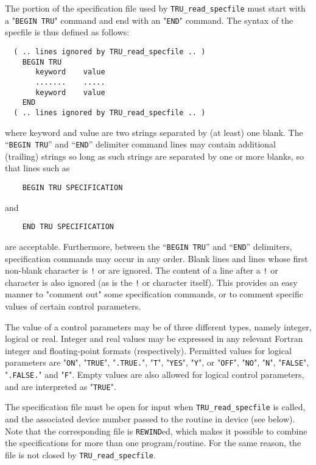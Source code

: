 \documentclass{galahad}
\newcommand{\packagename}{TRU}
\begin{document}
The portion of the specification file used by
{\tt \packagename\_read\_specfile}
must start
with a "{\tt BEGIN \packagename}" command and end with an
"{\tt END}" command.  The syntax of the specfile is thus defined as follows:
\begin{verbatim}
  ( .. lines ignored by TRU_read_specfile .. )
    BEGIN TRU
       keyword    value
       .......    .....
       keyword    value
    END
  ( .. lines ignored by TRU_read_specfile .. )
\end{verbatim}
where keyword and value are two strings separated by (at least) one blank.
The ``{\tt BEGIN \packagename}'' and ``{\tt END}'' delimiter command lines
may contain additional (trailing) strings so long as such strings are
separated by one or more blanks, so that lines such as
\begin{verbatim}
    BEGIN TRU SPECIFICATION
\end{verbatim}
and
\begin{verbatim}
    END TRU SPECIFICATION
\end{verbatim}
are acceptable. Furthermore,
between the
``{\tt BEGIN \packagename}'' and ``{\tt END}'' delimiters,
specification commands may occur in any order.  Blank lines and
lines whose first non-blank character is {\tt !} or {\tt *} are ignored.
The content
of a line after a {\tt !} or {\tt *} character is also
ignored (as is the {\tt !} or {\tt *}
character itself). This provides an easy manner to "comment out" some
specification commands, or to comment specific values
of certain control parameters.

The value of a control parameters may be of three different types, namely
integer, logical or real.
Integer and real values may be expressed in any relevant Fortran integer and
floating-point formats (respectively). Permitted values for logical
parameters are "{\tt ON}", "{\tt TRUE}", "{\tt .TRUE.}", "{\tt T}",
"{\tt YES}", "{\tt Y}", or "{\tt OFF}", "{\tt NO}",
"{\tt N}", "{\tt FALSE}", "{\tt .FALSE.}" and "{\tt F}".
Empty values are also allowed for
logical control parameters, and are interpreted as "{\tt TRUE}".

The specification file must be open for
input when {\tt \packagename\_read\_specfile}
is called, and the associated device number
passed to the routine in device (see below).
Note that the corresponding
file is {\tt REWIND}ed, which makes it possible to combine the specifications
for more than one program/routine.  For the same reason, the file is not
closed by {\tt \packagename\_read\_specfile}.
\end{document}
